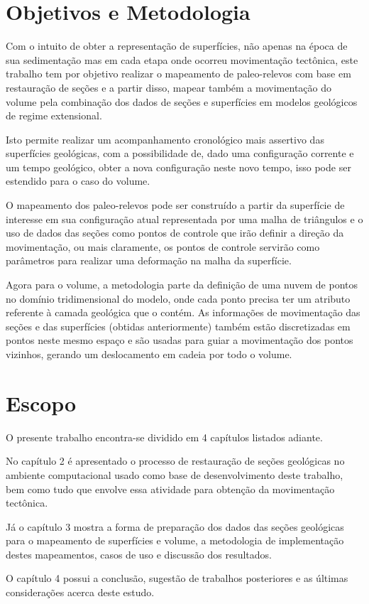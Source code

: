 \fi

\section{Objetivos e Metodologia}

Com o intuito de obter a representação de superfícies, não apenas na época de sua sedimentação mas em cada etapa onde ocorreu movimentação tectônica, este trabalho tem por objetivo realizar o mapeamento de paleo-relevos com base em restauração de seções e a partir disso, mapear também a movimentação do volume pela combinação dos dados de seções e superfícies em modelos geológicos de regime extensional.

Isto permite realizar um acompanhamento cronológico mais assertivo das superfícies geológicas, com a possibilidade de, dado uma configuração corrente e um tempo geológico, obter a nova configuração neste novo tempo, isso pode ser estendido para o caso do volume.

O mapeamento dos paleo-relevos pode ser construído a partir da superfície de interesse em sua configuração atual representada por uma malha de triângulos e o uso de dados das seções como pontos de controle que irão definir a direção da movimentação, ou mais claramente, os pontos de controle servirão como parâmetros para realizar uma deformação na malha da superfície.

Agora para o volume, a metodologia parte da definição de uma nuvem de pontos no domínio tridimensional do modelo, onde cada ponto precisa ter um atributo referente à camada geológica que o contém. As informações de movimentação das seções e das superfícies (obtidas anteriormente) também estão discretizadas em pontos neste mesmo espaço e são usadas para guiar a movimentação dos pontos vizinhos, gerando um deslocamento em cadeia por todo o volume. 

\section{Escopo}

O presente trabalho encontra-se dividido em 4 capítulos listados adiante.

No capítulo 2 é apresentado o processo de restauração de seções geológicas no ambiente computacional usado como base de desenvolvimento deste trabalho, bem como tudo que envolve essa atividade para obtenção da movimentação tectônica.

Já o capítulo 3 mostra a forma de preparação dos dados das seções geológicas para o mapeamento de superfícies e volume, a metodologia de implementação destes mapeamentos, casos de uso e discussão dos resultados.

O capítulo 4 possui a conclusão, sugestão de trabalhos posteriores e as últimas considerações acerca deste estudo.




